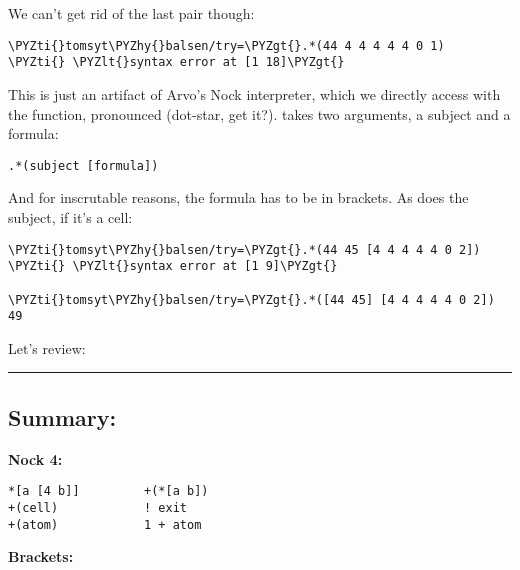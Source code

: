 We can't get rid of the last pair though:

\begin{framed_shaded}
\begin{Verbatim}[fontsize=\relsize{-2.5},fontseries=b,commandchars=\\\{\}]
\PYZti{}tomsyt\PYZhy{}balsen/try=\PYZgt{}.*(44 4 4 4 4 4 0 1)
\PYZti{} \PYZlt{}syntax error at [1 18]\PYZgt{}
\end{Verbatim}
\end{framed_shaded}

This is just an artifact of Arvo's Nock interpreter, which we directly access
with the  function, pronounced  (dot-star, get it?).  takes two
arguments, a subject and a formula:
\begin{framed_shaded}
\begin{Verbatim}[fontsize=\relsize{-2.5},fontseries=b,commandchars=\\\{\}]
.*(subject [formula])
\end{Verbatim}
\end{framed_shaded}
And for inscrutable reasons, the formula has to be in brackets. As does the
subject, if it's a cell:
\begin{framed_shaded}
\begin{Verbatim}[fontsize=\relsize{-2.5},fontseries=b,commandchars=\\\{\}]
\PYZti{}tomsyt\PYZhy{}balsen/try=\PYZgt{}.*(44 45 [4 4 4 4 4 0 2])
\PYZti{} \PYZlt{}syntax error at [1 9]\PYZgt{}

\PYZti{}tomsyt\PYZhy{}balsen/try=\PYZgt{}.*([44 45] [4 4 4 4 4 0 2])
49
\end{Verbatim}
\end{framed_shaded}
Let's review:

\begin{center}
\rule{3in}{0.4pt}
\end{center}

\subsection{Summary:}

\textbf{Nock 4:}
\begin{framed_shaded}
\begin{Verbatim}[fontsize=\relsize{-2.5},fontseries=b,commandchars=\\\{\}]
*[a [4 b]]         +(*[a b])
+(cell)            ! exit
+(atom)            1 + atom
\end{Verbatim}
\end{framed_shaded}
\textbf{Brackets:}

